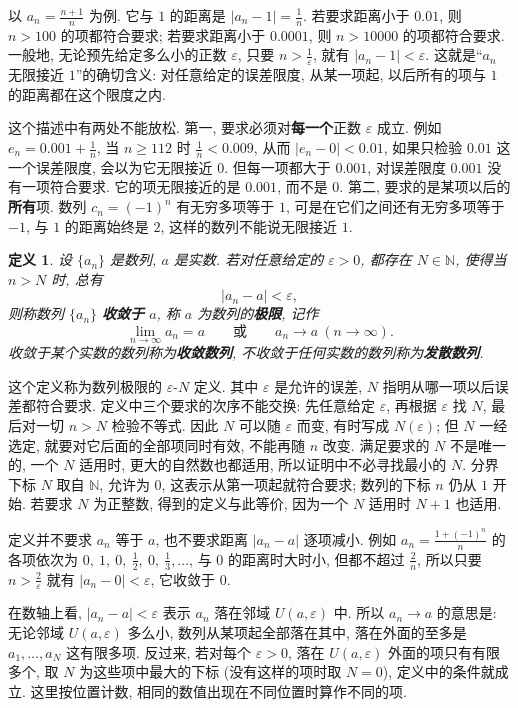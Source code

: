 \documentclass[UTF8,openany]{ctexbook}
\theoremstyle{chinesetextbook}
\newtheorem{definition}{定义}[section]
\begin{document}
以 $\displaystyle a_n=\frac{n+1}n$ 为例. 它与 $1$ 的距离是 $\displaystyle|a_n-1|=\frac1n$. 若要求距离小于 $0.01$, 则 $n>100$ 的项都符合要求; 若要求距离小于 $0.0001$, 则 $n>10000$ 的项都符合要求. 一般地, 无论预先给定多么小的正数 $\varepsilon$, 只要 $\displaystyle n>\frac1\varepsilon$, 就有 $|a_n-1|<\varepsilon$. 这就是“$a_n$ 无限接近 $1$”的确切含义: 对任意给定的误差限度, 从某一项起, 以后所有的项与 $1$ 的距离都在这个限度之内.

这个描述中有两处不能放松. 第一, 要求必须对\textbf{每一个}正数 $\varepsilon$ 成立. 例如 $\displaystyle e_n=0.001+\frac1n$, 当 $n\ge112$ 时 $\displaystyle\frac1n<0.009$, 从而 $|e_n-0|<0.01$, 如果只检验 $0.01$ 这一个误差限度, 会以为它无限接近 $0$. 但每一项都大于 $0.001$, 对误差限度 $0.001$ 没有一项符合要求. 它的项无限接近的是 $0.001$, 而不是 $0$. 第二, 要求的是某项以后的\textbf{所有}项. 数列 $c_n=(-1)^n$ 有无穷多项等于 $1$, 可是在它们之间还有无穷多项等于 $-1$, 与 $1$ 的距离始终是 $2$, 这样的数列不能说无限接近 $1$.
\begin{definition}
设 $\{a_n\}$ 是数列, $a$ 是实数. 若对任意给定的 $\varepsilon>0$, 都存在 $N\in\mathbb N$, 使得当 $n>N$ 时, 总有
\[
|a_n-a|<\varepsilon,
\]
则称数列 $\{a_n\}$ \textbf{收敛于} $a$, 称 $a$ 为数列的\textbf{极限}, 记作
\[
\lim_{n\to\infty}a_n=a\qquad\text{或}\qquad a_n\to a\ (n\to\infty).
\]
收敛于某个实数的数列称为\textbf{收敛数列}, 不收敛于任何实数的数列称为\textbf{发散数列}.
\end{definition}
这个定义称为数列极限的 $\varepsilon$-$N$ 定义. 其中 $\varepsilon$ 是允许的误差, $N$ 指明从哪一项以后误差都符合要求. 定义中三个要求的次序不能交换: 先任意给定 $\varepsilon$, 再根据 $\varepsilon$ 找 $N$, 最后对一切 $n>N$ 检验不等式. 因此 $N$ 可以随 $\varepsilon$ 而变, 有时写成 $N(\varepsilon)$; 但 $N$ 一经选定, 就要对它后面的全部项同时有效, 不能再随 $n$ 改变. 满足要求的 $N$ 不是唯一的, 一个 $N$ 适用时, 更大的自然数也都适用, 所以证明中不必寻找最小的 $N$. 分界下标 $N$ 取自 $\mathbb N$, 允许为 $0$, 这表示从第一项起就符合要求; 数列的下标 $n$ 仍从 $1$ 开始. 若要求 $N$ 为正整数, 得到的定义与此等价, 因为一个 $N$ 适用时 $N+1$ 也适用.

定义并不要求 $a_n$ 等于 $a$, 也不要求距离 $|a_n-a|$ 逐项减小. 例如 $\displaystyle a_n=\frac{1+(-1)^n}n$ 的各项依次为 $\displaystyle0,\ 1,\ 0,\ \frac12,\ 0,\ \frac13,\ldots$, 与 $0$ 的距离时大时小, 但都不超过 $\displaystyle\frac2n$, 所以只要 $\displaystyle n>\frac2\varepsilon$ 就有 $|a_n-0|<\varepsilon$, 它收敛于 $0$.

在数轴上看, $|a_n-a|<\varepsilon$ 表示 $a_n$ 落在邻域 $U(a,\varepsilon)$ 中. 所以 $a_n\to a$ 的意思是: 无论邻域 $U(a,\varepsilon)$ 多么小, 数列从某项起全部落在其中, 落在外面的至多是 $a_1,\ldots,a_N$ 这有限多项. 反过来, 若对每个 $\varepsilon>0$, 落在 $U(a,\varepsilon)$ 外面的项只有有限多个, 取 $N$ 为这些项中最大的下标 (没有这样的项时取 $N=0$), 定义中的条件就成立. 这里按位置计数, 相同的数值出现在不同位置时算作不同的项.
\end{document}
